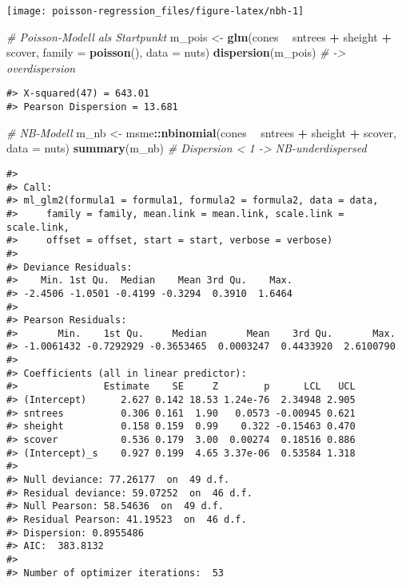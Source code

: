 \documentclass[ngerman,a4paper,]{scrartcl}
\newenvironment{Shaded}{\begin{snugshade}}{\end{snugshade}}
\newcommand{\CommentTok}[1]{\textcolor[rgb]{0.56,0.35,0.01}{\textit{#1}}}
\newcommand{\DataTypeTok}[1]{\textcolor[rgb]{0.13,0.29,0.53}{#1}}
\newcommand{\KeywordTok}[1]{\textcolor[rgb]{0.13,0.29,0.53}{\textbf{#1}}}
\newcommand{\NormalTok}[1]{#1}
\newcommand{\OperatorTok}[1]{\textcolor[rgb]{0.81,0.36,0.00}{\textbf{#1}}}
\newcommand{\StringTok}[1]{\textcolor[rgb]{0.31,0.60,0.02}{#1}}
\theoremstyle{definition}
\theoremstyle{definition}
\theoremstyle{definition}
\theoremstyle{remark}
\begin{document}
\begin{center}\texttt{[image: poisson-regression\_files/figure-latex/nbh-1]} \end{center}

\begin{Shaded}
\begin{Highlighting}[]
\CommentTok{# Poisson-Modell als Startpunkt}
\NormalTok{m_pois <-}\StringTok{ }\KeywordTok{glm}\NormalTok{(cones }\OperatorTok{~}\StringTok{ }\NormalTok{sntrees }\OperatorTok{+}\StringTok{ }\NormalTok{sheight }\OperatorTok{+}\StringTok{ }\NormalTok{scover, }\DataTypeTok{family =} \KeywordTok{poisson}\NormalTok{(), }\DataTypeTok{data =}\NormalTok{ nuts) }
\KeywordTok{dispersion}\NormalTok{(m_pois) }\CommentTok{# -> overdispersion }
\end{Highlighting}
\end{Shaded}

\begin{verbatim}
#> X-squared(47) = 643.01
#> Pearson Dispersion = 13.681
\end{verbatim}

\begin{Shaded}
\begin{Highlighting}[]
\CommentTok{# NB-Modell}
\NormalTok{m_nb <-}\StringTok{ }\NormalTok{msme}\OperatorTok{::}\KeywordTok{nbinomial}\NormalTok{(cones }\OperatorTok{~}\StringTok{ }\NormalTok{sntrees }\OperatorTok{+}\StringTok{ }\NormalTok{sheight }\OperatorTok{+}\StringTok{ }\NormalTok{scover, }\DataTypeTok{data =}\NormalTok{ nuts)}
\KeywordTok{summary}\NormalTok{(m_nb) }\CommentTok{# Dispersion < 1 -> NB-underdispersed}
\end{Highlighting}
\end{Shaded}

\begin{verbatim}
#> 
#> Call:
#> ml_glm2(formula1 = formula1, formula2 = formula2, data = data, 
#>     family = family, mean.link = mean.link, scale.link = scale.link, 
#>     offset = offset, start = start, verbose = verbose)
#> 
#> Deviance Residuals:
#>    Min. 1st Qu.  Median    Mean 3rd Qu.    Max. 
#> -2.4506 -1.0501 -0.4199 -0.3294  0.3910  1.6464 
#> 
#> Pearson Residuals:
#>       Min.    1st Qu.     Median       Mean    3rd Qu.       Max. 
#> -1.0061432 -0.7292929 -0.3653465  0.0003247  0.4433920  2.6100790 
#> 
#> Coefficients (all in linear predictor):
#>               Estimate    SE     Z        p      LCL   UCL
#> (Intercept)      2.627 0.142 18.53 1.24e-76  2.34948 2.905
#> sntrees          0.306 0.161  1.90   0.0573 -0.00945 0.621
#> sheight          0.158 0.159  0.99    0.322 -0.15463 0.470
#> scover           0.536 0.179  3.00  0.00274  0.18516 0.886
#> (Intercept)_s    0.927 0.199  4.65 3.37e-06  0.53584 1.318
#> 
#> Null deviance: 77.26177  on  49 d.f.
#> Residual deviance: 59.07252  on  46 d.f.
#> Null Pearson: 58.54636  on  49 d.f.
#> Residual Pearson: 41.19523  on  46 d.f.
#> Dispersion: 0.8955486
#> AIC:  383.8132
#> 
#> Number of optimizer iterations:  53
\end{verbatim}
\end{document}
